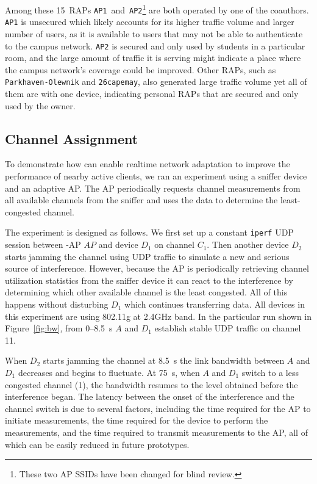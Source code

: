 Among these 15~RAPs \texttt{AP1}~and~\texttt{AP2}\footnote{These two AP SSIDs
have been changed for blind review.} are both operated by one of the
coauthors. \texttt{AP1} is unsecured which likely accounts for its higher
traffic volume and larger number of users, as it is available to users that
may not be able to authenticate to the campus network. \texttt{AP2} is
secured and only used by students in a particular room, and the large amount
of traffic it is serving might indicate a place where the campus network's
coverage could be improved. Other RAPs, such as \texttt{Parkhaven-Olewnik}
and \texttt{26capemay}, also generated large traffic volume yet all of them
are with one device, indicating personal RAPs that are secured and only used
by the owner.

\subsection{Channel Assignment}
\label{subsec-channel}

To demonstrate how \PS{} can enable realtime network adaptation to improve
the performance of nearby active clients, we ran an experiment using a
sniffer device and an adaptive AP. The AP periodically requests channel
measurements from all available channels from the sniffer and uses the data
to determine the least-congested channel.

The experiment is designed as follows. We first set up a constant
\texttt{iperf} UDP session between \PS{}-AP $AP$ and device $D_1$ on channel
$C_1$. Then another device $D_2$ starts jamming the channel using UDP traffic
to simulate a new and serious source of interference. However, because the AP
is periodically retrieving channel utilization statistics from the sniffer
device it can react to the interference by determining which other available
channel is the least congested. All of this happens without disturbing $D_1$
which continues transferring data. All devices in this experiment are using
802.11g at 2.4GHz band. In the particular run shown in Figure~\ref{fig:bw},
from 0--8.5~s $A$ and $D_1$ establish stable UDP traffic on channel 11.

When $D_2$ starts jamming the channel at 8.5~s the link bandwidth between $A$
and $D_1$ decreases and begins to fluctuate. At 75~s, when $A$ and $D_1$
switch to a less congested channel (1), the bandwidth resumes to the level
obtained before the interference began. The latency between the onset of the
interference and the channel switch is due to several factors, including the
time required for the AP to initiate measurements, the time required for the
device to perform the measurements, and the time required to transmit measurements to
the AP, all of which can be easily reduced in future prototypes.

